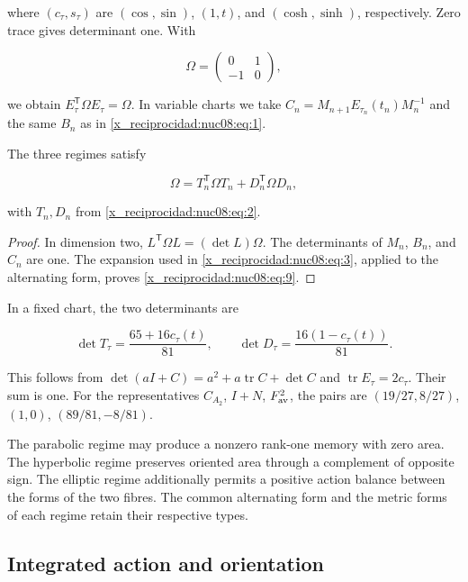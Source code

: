 where \((c_\tau,s_\tau)\) are \((\cos,\sin)\), \((1,t)\), and \((\cosh,\sinh)\), respectively. Zero trace gives determinant one. With

\[
\Omega=\begin{pmatrix}0&1\\-1&0\end{pmatrix},
\]

we obtain \(E_\tau^\mathsf T\Omega E_\tau=\Omega\). In variable charts we take
\(C_n=M_{n+1}E_{\tau_n}(t_n)M_n^{-1}\) and the same \(B_n\) as in \eqref{x_reciprocidad:nuc08:eq:1}.

\begin{theorem}
The three regimes satisfy

\begin{equation}
\boxed{\Omega=T_n^\mathsf T\Omega T_n+D_n^\mathsf T\Omega D_n,}
\label{x_reciprocidad:nuc08:eq:9}
\end{equation}

with \(T_n,D_n\) from \eqref{x_reciprocidad:nuc08:eq:2}.
\end{theorem}

\begin{proof}
In dimension two, \(L^\mathsf T\Omega L=(\det L)\Omega\). The determinants of \(M_n\), \(B_n\), and \(C_n\) are one. The expansion used in \eqref{x_reciprocidad:nuc08:eq:3}, applied to the alternating form, proves \eqref{x_reciprocidad:nuc08:eq:9}.
\end{proof}

In a fixed chart, the two determinants are

\begin{equation}
\det T_\tau=\frac{65+16c_\tau(t)}{81},\qquad
\det D_\tau=\frac{16(1-c_\tau(t))}{81}.
\label{x_reciprocidad:nuc08:eq:10}
\end{equation}

This follows from \(\det(aI+C)=a^2+a\operatorname{tr}C+\det C\) and \(\operatorname{tr}E_\tau=2c_\tau\). Their sum is one. For the representatives \(C_{A_2}\), \(I+N\), \(F_{\rm av}^2\), the pairs are \((19/27,8/27)\), \((1,0)\), \((89/81,-8/81)\).

The parabolic regime may produce a nonzero rank-one memory with zero area. The hyperbolic regime preserves oriented area through a complement of opposite sign. The elliptic regime additionally permits a positive action balance between the forms of the two fibres. The common alternating form and the metric forms of each regime retain their respective types.

\subsection{Integrated action and orientation}

